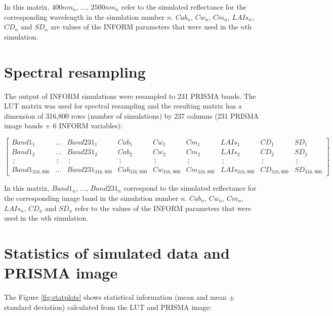 \documentclass[a4paper, twoside]{templates/ociamthesis}
\begin{document}
In this matrix, \(400nm_{n}\), \(\dots\), \(2500nm_{n}\) refer to the simulated reflectance for the corresponding wavelength in the simulation number \(n\). \(Cab_{n}\), \(Cw_{n}\), \(Cm_{n}\), \(LAIs_{n}\), \(CD_{n}\) and \(SD_{n}\) are values of the INFORM parameters that were used in the \(n\)th simulation.

\hypertarget{spectral-resampling-1}{%
\section{Spectral resampling}\label{spectral-resampling-1}}

The output of INFORM simulations were resampled to 231 PRISMA bands. The LUT matrix was used for spectral resampling and the resulting matrix has a dimension of 316,800 rows (number of simulations) by 237 columns (231 PRISMA image bands + 6 INFORM variables):

\begingroup
\tiny

\[
\begin{bmatrix}
Band1_{1} & \dots & Band231_{1} & Cab_{1} & Cw_{1} & Cm_{1} & LAIs_{1} & CD_{1} & SD_{1}\\
Band1_{2} & \dots & Band231_{2} & Cab_{2} & Cw_{2} & Cm_{2} & LAIs_{2} & CD_{2} & SD_{2}\\
\ \vdots  &\ \vdots &\ \vdots &\ \vdots &\ \vdots &\ \vdots &\ \vdots &\ \vdots &\ \vdots\\
Band1_{316,800} & \dots & Band231_{316,800} & Cab_{316,800} & Cw_{316,800} & Cm_{316,800} & LAIs_{316,800} & CD_{316,800} & SD_{316,800}
\end{bmatrix}
\]
\endgroup

In this matrix, \(Band1_{n}\), \(\dots\), \(Band231_{n}\) correspond to the simulated reflectance for the corresponding image band in the simulation number \(n\). \(Cab_{n}\), \(Cw_{n}\), \(Cm_{n}\), \(LAIs_{n}\), \(CD_{n}\) and \(SD_{n}\) refer to the values of the INFORM parameters that were used in the \(n\)th simulation.

\hypertarget{statistics-of-simulated-data-and-prisma-image-1}{%
\section{Statistics of simulated data and PRISMA image}\label{statistics-of-simulated-data-and-prisma-image-1}}

The Figure \ref{fig:statplots} shows statistical information (mean and mean \(\pm\) standard deviation) calculated from the LUT and PRISMA image:
\end{document}
